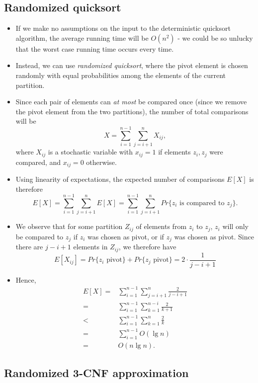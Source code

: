 \subsection{Randomized quicksort}
\begin{itemize}
\item If we make no assumptions on the input to the deterministic
  quicksort algorithm, the average running time will be $O(n^2)$ - we
  could be so unlucky that the worst case running time occurs every
  time.
\item Instead, we can use \emph{randomized quicksort}, where the pivot
  element is chosen randomly with equal probabilities among the
  elements of the current partition.
\item Since each pair of elements can \emph{at most} be compared once
  (since we remove the pivot element from the two partitions), the
  number of total comparisons will be
$$
 X = \sum_{i=1}^{n-1} \sum_{j=i+1}^n X_{ij},
$$
where $X_{ij}$ is a stochastic variable with $x_{ij} = 1$ if elements
$z_i,z_j$ were compared, and $x_{ij} = 0$ otherwise.

\item Using linearity of expectations, the expected number of
  comparisons $E[X]$ is therefore
$$
 E[X] = \sum_{i=1}^{n-1} \sum_{j=i+1}^n E[X] = \sum_{i=1}^{n-1} \sum_{j=i+1}^n Pr \{\text{$z_i$ is compared to $z_j$}\}.
$$

\item We observe that for some partition $Z_{ij}$ of elements from
  $z_i$ to $z_j$, $z_i$ will only be compared to $z_j$ if $z_i$ was
  chosen as pivot, or if $z_j$ was chosen as pivot. Since there are $j
  - i + 1$ elements in $Z_{ij}$, we therefore have
$$
  E[X_{ij}] = Pr\{\text{$z_i$ pivot}\} + Pr\{\text{$z_j$ pivot}\} = 2 \cdot \frac{1}{j-i+1}
$$

\item Hence,
\begin{align*}
 E[X] ={}& \sum_{i=1}^{n-1} \sum_{j=i+1}^n \frac{2}{j-i+1} \\
      ={}& \sum_{i=1}^{n-1} \sum_{k=1}^{n-i} \frac{2}{k+1} \\
      <{}& \sum_{i=1}^{n-1} \sum_{k=1}^n \frac{2}{k} \\
      ={}& \sum_{i=1}^{n-1} O(\lg n) \\
      ={}& O(n \lg n).
\end{align*}
\end{itemize}


\subsection{Randomized 3-CNF approximation}

